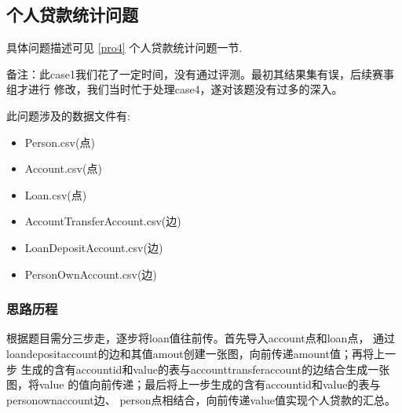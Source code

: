 \subsection{个人贷款统计问题}
具体问题描述可见 \ref{pro4} 个人贷款统计问题一节.

备注：此case1我们花了一定时间，没有通过评测。最初其结果集有误，后续赛事组才进行
修改，我们当时忙于处理case4，遂对该题没有过多的深入。

此问题涉及的数据文件有:
\begin{itemize}
  \item Person.csv(点)
  \item Account.csv(点)
  \item Loan.csv(点)
  \item AccountTransferAccount.csv(边)
  \item LoanDepositAccount.csv(边)
  \item PersonOwnAccount.csv(边)
\end{itemize}

\subsubsection{思路历程}
根据题目需分三步走，逐步将loan值往前传。首先导入account点和loan点，
通过loandepositaccount的边和其值amout创建一张图，向前传递amount值；再将上一步
生成的含有accountid和value的表与accounttransferaccount的边结合生成一张图，将value
的值向前传递；最后将上一步生成的含有accountid和value的表与personownaccount边、
person点相结合，向前传递value值实现个人贷款的汇总。

